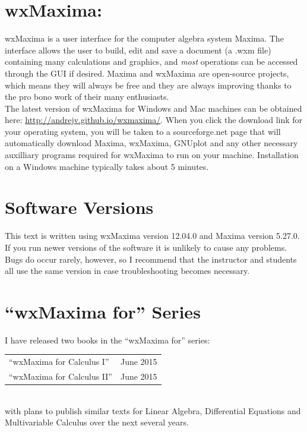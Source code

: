 \documentclass[10.5pt,twoside]{report}
\theoremstyle{definition}
\begin{document}
\section*{\large{wxMaxima:}}

wxMaxima is a user interface for the computer algebra system
Maxima.   The interface allows the user to build, edit and save a 
document (a .wxm file) containing many calculations and graphics, 
and \textit{most} operations can be accessed through the GUI if desired.  Maxima and wxMaxima are open-source projects, which means they will always be free and they are always improving thanks to the pro bono work of their many enthusiasts.\\

The latest version of wxMaxima for Windows and Mac machines can be 
obtained here: \url{http://andrejv.github.io/wxmaxima/}.  When you click the 
download link for your operating system, you will be taken to a 
sourceforge.net page that will automatically download Maxima, 
wxMaxima, GNUplot and any other necessary auxilliary programs required 
for wxMaxima to run on your machine.  Installation on a Windows machine
typically takes about 5 minutes.


\section*{\large{Software Versions}}

This text is written using wxMaxima version 12.04.0 and Maxima version 
5.27.0.  If you run newer versions of the software it is 
unlikely to cause any problems.  Bugs do occur rarely, however, so I 
recommend that the instructor and students all use the same version 
in case troubleshooting becomes necessary.

\pagebreak
\section*{\large{``wxMaxima for'' Series}}

I have released two books in the ``wxMaxima for'' series:\\

\begin{tabular}{l c}
 ``wxMaxima for Calculus I''	&June 2015\\
 ``wxMaxima for Calculus II'' &June 2015\\

\end{tabular}

${}$\\
with plans to publish similar texts for Linear Algebra, Differential Equations and Multivariable Calculus over the next several years.\\
\end{document}
